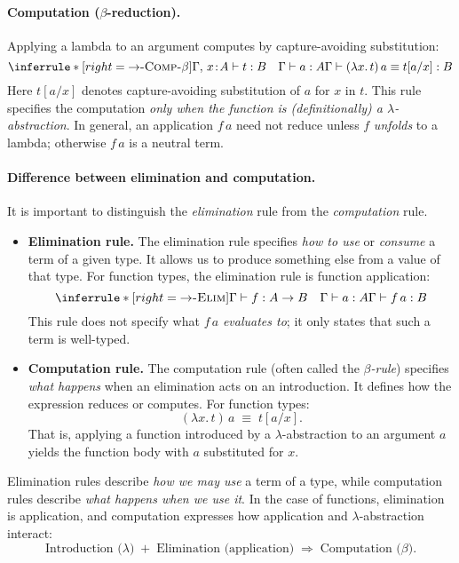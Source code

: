 \documentclass{article}
\newcommand{\judg}[3]{#1 \vdash #2 : #3}   %
\newcommand{\jdeq}{\equiv}                 %
\newcommand{\teq}[4]{#1 \vdash #2 \jdeq #3 : #4} %
\newcommand{\rulename}[1]{\textsc{#1}}
\begin{document}
\paragraph{Computation (\(\beta\)-reduction).}
Applying a lambda to an argument computes by capture-avoiding substitution:
\[
\inferrule*[right=\rulename{\(\to\)-Comp-\(\beta\)}]{
  \judg{\Gamma,\,x\!:\!A}{t}{B}
  \quad
  \judg{\Gamma}{a}{A}
}{
  \teq{\Gamma}{(\lambda x.\,t)\,a}{t[a/x]}{B}
}
\]
Here \(t[a/x]\) denotes capture-avoiding substitution of \(a\) for \(x\) in \(t\). This rule specifies the computation \emph{only when the function is (definitionally) a \(\lambda\)-abstraction}. In general, an application \(f\,a\) need not reduce unless \(f\) \emph{unfolds} to a lambda; otherwise \(f\,a\) is a neutral term.

\paragraph{Difference between elimination and computation.}
It is important to distinguish the \emph{elimination} rule from the \emph{computation} rule.

\begin{itemize}
  \item \textbf{Elimination rule.}  
  The elimination rule specifies \emph{how to use} or \emph{consume} a term of a given type.
  It allows us to produce something else from a value of that type.
  For function types, the elimination rule is function application:
  \[
  \inferrule*[right=\rulename{\(\to\)-Elim}]{
    \judg{\Gamma}{f}{A \to B}
    \quad
    \judg{\Gamma}{a}{A}
  }{
    \judg{\Gamma}{f\,a}{B}
  }
  \]
  This rule does not specify what $f\,a$ \emph{evaluates to}; it only states that
  such a term is well-typed.

  \item \textbf{Computation rule.}  
  The computation rule (often called the \emph{$\beta$-rule}) specifies
  \emph{what happens} when an elimination acts on an introduction.
  It defines how the expression reduces or computes.
  For function types:
  \[
  (\lambda x.\,t)\,a \;\jdeq\; t[a/x].
  \]
  That is, applying a function introduced by a $\lambda$-abstraction
  to an argument $a$ yields the function body with $a$ substituted for $x$.

\end{itemize}

Elimination rules describe \emph{how we may use} a term of a type,
while computation rules describe \emph{what happens when we use it}.
In the case of functions, elimination is application,
and computation expresses how application and $\lambda$-abstraction interact:
\[
\text{Introduction (}\lambda\text{)} \;+\; \text{Elimination (application)} \;\Rightarrow\; \text{Computation (}\beta\text{)}.
\]
\end{document}
